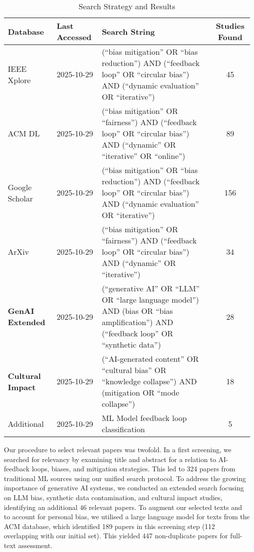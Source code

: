 \documentclass[11pt]{article}
\begin{document}
\begin{table}[ht]
\centering
\caption{Search Strategy and Results}
\label{tab:search}
\small
\begin{tabular}{@{}llp{5cm}c@{}}
\toprule
\textbf{Database} & \textbf{Last Accessed} & \textbf{Search String} & \textbf{Studies Found} \\
\midrule
IEEE Xplore & 2025-10-29 & (``bias mitigation'' OR ``bias reduction'') AND (``feedback loop'' OR ``circular bias'') AND (``dynamic evaluation'' OR ``iterative'') & 45 \\
ACM DL & 2025-10-29 & (``bias mitigation'' OR ``fairness'') AND (``feedback loop'' OR ``circular bias'') AND (``dynamic'' OR ``iterative'' OR ``online'') & 89 \\
Google Scholar & 2025-10-29 & (``bias mitigation'' OR ``bias reduction'') AND (``feedback loop'' OR ``circular bias'') AND (``dynamic evaluation'' OR ``iterative'') & 156 \\
ArXiv & 2025-10-29 & (``bias mitigation'' OR ``fairness'') AND (``feedback loop'' OR ``circular bias'') AND (``dynamic'' OR ``iterative'') & 34 \\
\textbf{GenAI Extended} & 2025-10-29 & (``generative AI'' OR ``LLM'' OR ``large language model'') AND (bias OR ``bias amplification'') AND (``feedback loop'' OR ``synthetic data'') & 28 \\
\textbf{Cultural Impact} & 2025-10-29 & (``AI-generated content'' OR ``cultural bias'' OR ``knowledge collapse'') AND (mitigation OR ``mode collapse'') & 18 \\
Additional & 2025-10-29 & ML Model feedback loop classification & 5 \\
\bottomrule
\end{tabular}
\end{table}

Our procedure to select relevant papers was twofold. In a first screening, we searched for relevancy by examining title and abstract for a relation to AI-feedback loops, biases, and mitigation strategies. This led to 324 papers from traditional ML sources using our unified search protocol. To address the growing importance of generative AI systems, we conducted an extended search focusing on LLM bias, synthetic data contamination, and cultural impact studies, identifying an additional 46 relevant papers. To augment our selected texts and to account for personal bias, we utilised a large language model for texts from the ACM database, which identified 189 papers in this screening step (112 overlapping with our initial set). This yielded 447 non-duplicate papers for full-text assessment.
\end{document}
